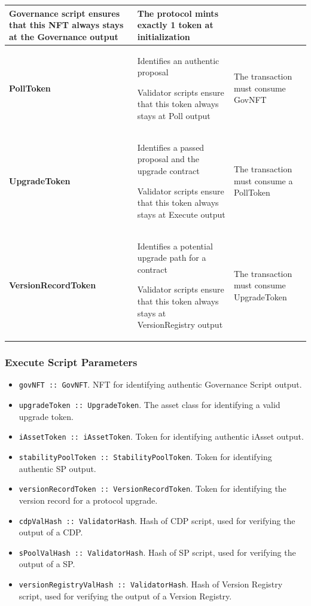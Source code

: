 \documentclass{article}
\begin{document}
\begin{sloppypar}
\begin{tabularx}{\linewidth}{l|L|L}
Governance script ensures that this NFT always stays at the Governance
output
&
The protocol mints exactly 1 token at initialization
\tabularnewline
\midrule
\textbf{PollToken}
&
Identifies an authentic proposal

Validator scripts ensure that this token always stays at Poll
output
&
The transaction must consume GovNFT
\tabularnewline
\midrule
\textbf{UpgradeToken}
&
Identifies a passed proposal and the upgrade contract

Validator scripts ensure that this token always stays at Execute
output
&
The transaction must consume a PollToken
\tabularnewline
\midrule
\textbf{VersionRecordToken}
&
Identifies a potential upgrade path for a contract

Validator scripts ensure that this token always stays at VersionRegistry
output
&
The transaction must consume UpgradeToken
\tabularnewline
\bottomrule
\end{tabularx}

\hypertarget{execute-script-parameters}{%
\subsubsection{Execute Script
Parameters}\label{execute-script-parameters}}

\begin{itemize}
\item
  \texttt{govNFT~::~GovNFT}. NFT for identifying authentic Governance
  Script output.
\item
  \texttt{upgradeToken~::~UpgradeToken}. The asset class for identifying
  a valid upgrade token.
\item
  \texttt{iAssetToken~::~iAssetToken}. Token for identifying authentic
  iAsset output.
\item
  \texttt{stabilityPoolToken~::~StabilityPoolToken}. Token for
  identifying authentic SP output.
\item
  \texttt{versionRecordToken~::~VersionRecordToken}. Token for
  identifying the version record for a protocol upgrade.
\item
  \texttt{cdpValHash~::~ValidatorHash}. Hash of CDP script, used for
  verifying the output of a CDP.
\item
  \texttt{sPoolValHash~::~ValidatorHash}. Hash of SP script, used for
  verifying the output of a SP.
\item
  \texttt{versionRegistryValHash~::~ValidatorHash}. Hash of Version
  Registry script, used for verifying the output of a Version Registry.
\end{itemize}


\end{sloppypar}
\end{document}
